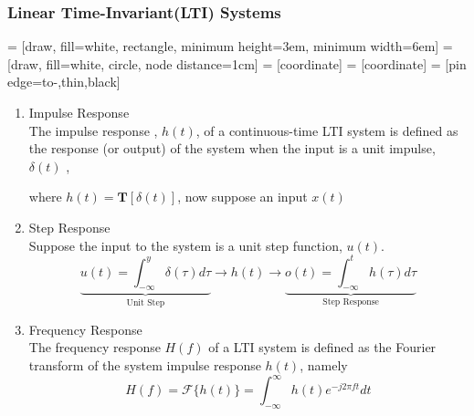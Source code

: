 \subsubsection{Linear Time-Invariant(LTI) Systems}
     = [draw, fill=white, rectangle, 
        minimum height=3em, minimum width=6em]
     = [draw, fill=white, circle, node distance=1cm]
     = [coordinate]
     = [coordinate]
     = [pin edge={to-,thin,black}]
\begin{enumerate}
    \item Impulse Response\\
    The impulse response , $h(t)$, of a continuous-time LTI system is defined as the response (or output) of the system when the input is a unit impulse, $\delta(t)$ ,
    \begin{center}
    \end{center}
    where $h(t)=\textbf{T}[\delta(t)]$, now suppose an input $x(t)$ 
    \begin{center}
    \end{center}
    \item Step Response \\
    Suppose the input to the system is a unit step function, $u(t)$.
    \[\underbrace{u(t)=\int^y_{-\infty}\delta(\tau)d\tau}_\text{Unit Step}\rightarrow\boxed{h(t)}\rightarrow \underbrace{o(t)=\int^t_{-\infty}h(\tau)d\tau}_\text{Step Response}\]
    \item Frequency Response\\
    The frequency response $H(f)$ of a LTI system is defined as the Fourier transform of the system impulse response $h(t)$, namely
    \[H(f) = \mathscr{F}\{h(t)\}=\int^{\infty}_{-\infty}h(t)e^{-j2\pi ft}dt\]

\end{enumerate}
